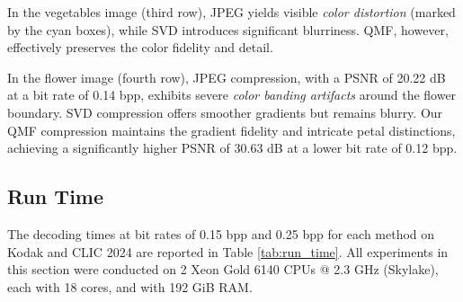 In the vegetables image (third row), JPEG yields visible \emph{color distortion} (marked by the cyan boxes), while SVD introduces significant blurriness. QMF, however, effectively preserves the color fidelity and detail.

In the flower image (fourth row), JPEG compression, with a PSNR of 20.22 dB at a bit rate of 0.14 bpp, exhibits severe \emph{color banding artifacts} around the flower boundary. SVD compression offers smoother gradients but remains blurry. Our QMF compression maintains the gradient fidelity and intricate petal distinctions, achieving a significantly higher PSNR of 30.63 dB at a lower bit rate of 0.12 bpp.


\subsection{Run Time} \label{sec:run_time}

The decoding times at bit rates of 0.15 bpp and 0.25 bpp for each method on Kodak and CLIC 2024 are reported in Table \ref{tab:run_time}. All experiments in this section were conducted on 2 Xeon Gold 6140 CPUs @ 2.3 GHz (Skylake), each with 18 cores, and with 192 GiB RAM.

\begin{table}[!t]
    \caption{Mean decoding CPU times for different compression methods at bit rates of 0.15 bpp and 0.25 bpp, measured on the Kodak and CLIC 2024 datasets.}
    \label{tab:run_time}
    \centering
    \def\arraystretch{1.2}
\end{table}


